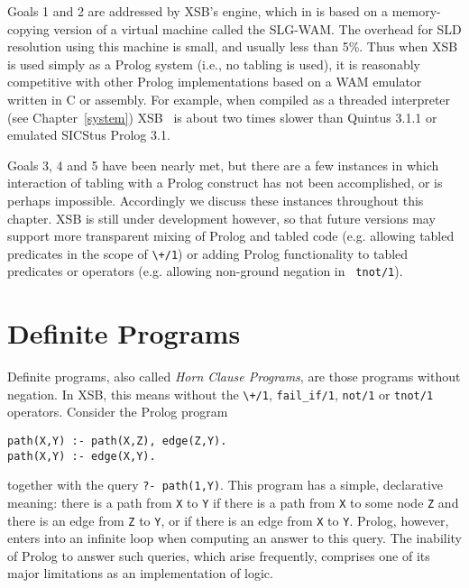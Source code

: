 Goals 1 and 2 are addressed by XSB's engine, which in \version{} is
based on a memory-copying version of a virtual machine called the
SLG-WAM\@.  The overhead for SLD resolution using this machine is small,
and usually less than 5\%.  Thus when XSB is used simply as a Prolog
system (i.e., no tabling is used), it is reasonably competitive with
other Prolog implementations based on a WAM emulator written in C or
assembly.  For example, when compiled as a threaded interpreter (see
Chapter~\ref{system}) XSB \version\ is about two times slower than
Quintus 3.1.1 or emulated SICStus Prolog 3.1.

Goals 3, 4 and 5 have been nearly met, but there are a few instances
in which interaction of tabling with a Prolog construct has not been
accomplished, or is perhaps impossible.  Accordingly we discuss these
instances throughout this chapter.  XSB is still under development
however, so that future versions may support more transparent mixing
of Prolog and tabled code (e.g. allowing tabled predicates in the
scope of \verb|\+/1|) or adding Prolog functionality to tabled
predicates or operators (e.g. allowing non-ground negation in {\tt
tnot/1}).


\section{Definite Programs}
\label{sec:def}

Definite programs, also called \emph{Horn Clause Programs}, are those
programs without negation.  In XSB, this means without the \verb|\+/1|,
{\tt fail\_if/1}, {\tt not/1} or {\tt tnot/1} operators.  Consider the
Prolog program
\begin{center}
\begin{minipage}{3.8in}
\begin{verbatim}
path(X,Y) :- path(X,Z), edge(Z,Y).
path(X,Y) :- edge(X,Y).
\end{verbatim}						       
\end{minipage}
\end{center}
together with the query {\tt ?- path(1,Y)}.  This program has a
simple, declarative meaning: there is a path from {\tt X} to {\tt Y}
if there is a path from {\tt X} to some node {\tt Z} and there is an
edge from {\tt Z} to {\tt Y}, or if there is an edge from {\tt X} to
{\tt Y}\@.  Prolog, however, enters into an infinite loop when
computing an answer to this query.  The inability of Prolog to answer
such queries, which arise frequently, comprises one of its major
limitations as an implementation of logic.

